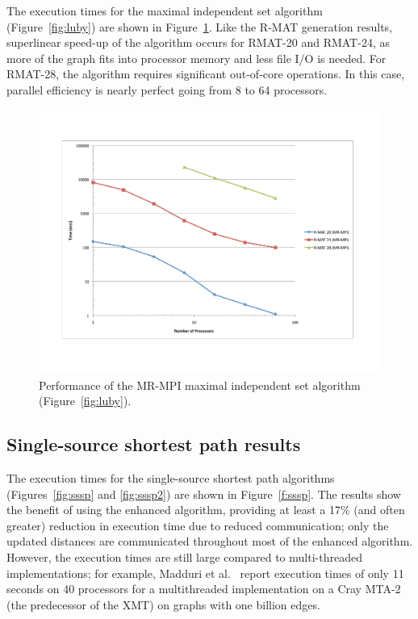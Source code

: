 The execution times for the maximal independent set algorithm
(Figure~\ref{fig:luby}) are shown in Figure~\ref{f:luby}.  Like the R-MAT
generation results, superlinear speed-up of the algorithm occurs for RMAT-20
and RMAT-24, as more of the graph fits into processor memory and less file
I/O is needed.  For RMAT-28, the algorithm requires significant out-of-core
operations. In this case, parallel efficiency is nearly perfect going from 
8 to 64 processors.

\begin{figure}[htb]
\includegraphics[width=\textwidth]{fig_luby.pdf}
\caption{Performance of the MR-MPI maximal independent set algorithm (Figure~\ref{fig:luby}).}
\label{f:luby}
\end{figure}

\subsection{Single-source shortest path results}

The execution times for the single-source shortest path algorithms
(Figures~\ref{fig:sssp} and \ref{fig:sssp2})
are shown in Figure~\ref{f:sssp}.  The results show the benefit of
using the enhanced algorithm, providing at least a 17\% (and often greater)
reduction in execution time due to reduced communication; only the updated
distances are communicated throughout most of the enhanced algorithm.
However, the execution times are still large compared to multi-threaded
implementations; for example, Madduri et al.~\cite{Madduri07} report
execution times of only 11 seconds on 40 
processors for a multithreaded implementation on a Cray MTA-2
(the predecessor of the XMT) on graphs with one billion edges.

